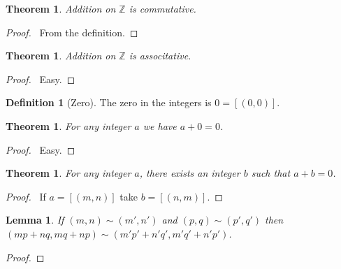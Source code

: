 \documentclass{report}
\let\qed\relax
\newtheorem{lemma}[axiom]{Lemma}
\newtheorem{theorem}[axiom]{Theorem}
\theoremstyle{definition}
\newtheorem{definition}[axiom]{Definition}
\begin{document}
    \begin{theorem}
        Addition on $\mathbb{Z}$ is commutative.
    \end{theorem}

    \begin{proof}
        \pf\ From the definition. \qed
    \end{proof}

    \begin{theorem}
        Addition on $\mathbb{Z}$ is associtative.
    \end{theorem}

    \begin{proof}
        \pf\ Easy. \qed
    \end{proof}

    \begin{definition}[Zero]
        The zero in the integers is $0 = [(0,0)]$.
    \end{definition}

    \begin{theorem}
        For any integer $a$ we have $a + 0 = 0$.
    \end{theorem}

    \begin{proof}
        \pf\ Easy. \qed
    \end{proof}

    \begin{theorem}
        For any integer $a$, there exists an integer $b$ such that $a + b = 0$.
    \end{theorem}

    \begin{proof}
        \pf\ If $a = [(m,n)]$ take $b = [(n,m)]$. \qed
    \end{proof}

    \begin{lemma}
        If $(m,n) \sim (m',n')$ and $(p,q) \sim (p',q')$ then $(mp+nq,mq+np) \sim (m'p'+n'q',
        m'q'+n' p')$.
    \end{lemma}

    \begin{proof}
        \pf
        \qed
    \end{proof}
\end{document}
